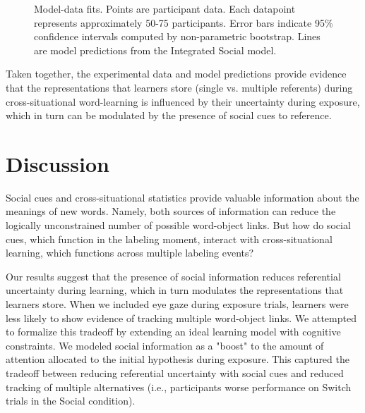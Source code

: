 \documentclass[man]{apa2}
\begin{document}
%
\begin{figure}[H]
	\centering
	\caption{Model-data fits. Points are participant data. Each datapoint represents approximately 50-75 participants. Error bars indicate 95\% confidence intervals computed by non-parametric bootstrap. Lines are model predictions from the Integrated Social model.}
\end{figure}
%

Taken together, the experimental data and model predictions provide evidence that the representations that learners store (single vs. multiple referents) during cross-situational word-learning is influenced by their uncertainty during exposure, which in turn can be modulated by the presence of social cues to reference. 


\section{Discussion}

Social cues and cross-situational statistics provide valuable information about the meanings of new words. Namely, both sources of information can reduce the logically unconstrained number of possible word-object links. But how do social cues, which function in the labeling moment, interact with cross-situational learning, which functions across multiple labeling events? 

Our results suggest that the presence of social information reduces referential uncertainty during learning, which in turn modulates the representations that learners store. When we included eye gaze during exposure trials, learners were less likely to show evidence of tracking multiple word-object links. We attempted to formalize this tradeoff by extending an ideal learning model with cognitive constraints. We modeled social information as a "boost" to the amount of attention allocated to the initial hypothesis during exposure. This captured the tradeoff between reducing referential uncertainty with social cues and reduced tracking of multiple alternatives (i.e., participants worse performance on Switch trials in the Social condition).
\end{document}
